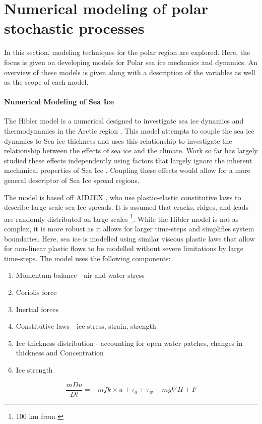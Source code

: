 \appendix

\chapter{Numerical modeling of polar stochastic processes}
\label{app:modelling}
In this section, modeling techniques for the polar region are explored. Here, the focus is given on developing models for Polar sea ice mechanics and dynamics. An overview of these models is given along with a description of the variables as well as the scope of each model.

\subsubsection{Numerical Modeling of Sea Ice}

The Hibler model is a numerical designed to investigate sea ice dynamics and thermodynamics in the Arctic region \cite{hibler1979dynamic}. This model attempts to couple the sea ice dynamics to Sea ice thickness and uses this relationship to investigate the relationship between the effects of sea ice and the climate. Work so far has largely studied these effects independently using factors that largely ignore the inherent mechanical properties of Sea Ice \cite{hibler1979dynamic}. Coupling these effects would allow for a more general descriptor of Sea Ice spread regions.\par

The model is based off \textcite{coon1974modeling} AIDJEX \cite{hibler1979dynamic}, who use plastic-elastic constitutive laws to describe large-scale sea Ice spreads. It is assumed that cracks, ridges, and leads are randomly distributed on large scales \footnote{100 km from \textcite{coon2007arctic}}. While the Hibler model is not as complex, it is more robust as it allows for larger time-steps and simplifies system boundaries. Here, sea ice is modelled using similar viscous plastic laws \cite{hibler1979dynamic} that allow for non-linear plastic flows to be modelled without severe limitations by large time-steps. The model uses the following components:

\begin{enumerate}
	\item    Momentum balance  - air and water stress
	\item    Coriolis force
	\item    Inertial forces
	\item    Constitutive laws - ice stress, strain, strength
	\item    Ice thickness distribution - accounting for open water patches, changes in thickness and Concentration
	\item    Ice strength 
\end{enumerate}
\begin{equation}
	\frac{mDu}{Dt} = -mfk\times u +\tau_a +\tau_w -mg \nabla H +F 
\end{equation}

